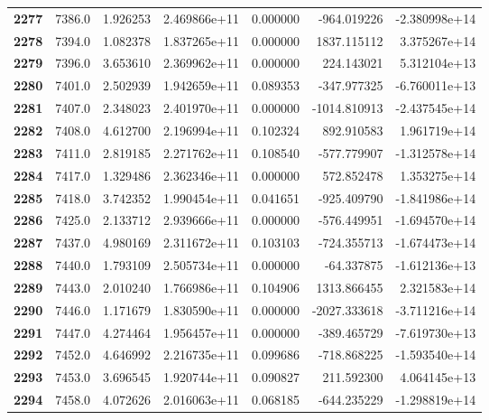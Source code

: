 \documentclass{report}[12pt]
\begin{document}
\begin{center}
\begin{tabular}{lrrrrrr}
\textbf{2277} &         7386.0 &   1.926253 &  2.469866e+11 &    0.000000 &  -964.019226 & -2.380998e+14 \\
\textbf{2278} &         7394.0 &   1.082378 &  1.837265e+11 &    0.000000 &  1837.115112 &  3.375267e+14 \\
\textbf{2279} &         7396.0 &   3.653610 &  2.369962e+11 &    0.000000 &   224.143021 &  5.312104e+13 \\
\textbf{2280} &         7401.0 &   2.502939 &  1.942659e+11 &    0.089353 &  -347.977325 & -6.760011e+13 \\
\textbf{2281} &         7407.0 &   2.348023 &  2.401970e+11 &    0.000000 & -1014.810913 & -2.437545e+14 \\
\textbf{2282} &         7408.0 &   4.612700 &  2.196994e+11 &    0.102324 &   892.910583 &  1.961719e+14 \\
\textbf{2283} &         7411.0 &   2.819185 &  2.271762e+11 &    0.108540 &  -577.779907 & -1.312578e+14 \\
\textbf{2284} &         7417.0 &   1.329486 &  2.362346e+11 &    0.000000 &   572.852478 &  1.353275e+14 \\
\textbf{2285} &         7418.0 &   3.742352 &  1.990454e+11 &    0.041651 &  -925.409790 & -1.841986e+14 \\
\textbf{2286} &         7425.0 &   2.133712 &  2.939666e+11 &    0.000000 &  -576.449951 & -1.694570e+14 \\
\textbf{2287} &         7437.0 &   4.980169 &  2.311672e+11 &    0.103103 &  -724.355713 & -1.674473e+14 \\
\textbf{2288} &         7440.0 &   1.793109 &  2.505734e+11 &    0.000000 &   -64.337875 & -1.612136e+13 \\
\textbf{2289} &         7443.0 &   2.010240 &  1.766986e+11 &    0.104906 &  1313.866455 &  2.321583e+14 \\
\textbf{2290} &         7446.0 &   1.171679 &  1.830590e+11 &    0.000000 & -2027.333618 & -3.711216e+14 \\
\textbf{2291} &         7447.0 &   4.274464 &  1.956457e+11 &    0.000000 &  -389.465729 & -7.619730e+13 \\
\textbf{2292} &         7452.0 &   4.646992 &  2.216735e+11 &    0.099686 &  -718.868225 & -1.593540e+14 \\
\textbf{2293} &         7453.0 &   3.696545 &  1.920744e+11 &    0.090827 &   211.592300 &  4.064145e+13 \\
\textbf{2294} &         7458.0 &   4.072626 &  2.016063e+11 &    0.068185 &  -644.235229 & -1.298819e+14 \\

\end{tabular}
\end{center}
\end{document}
